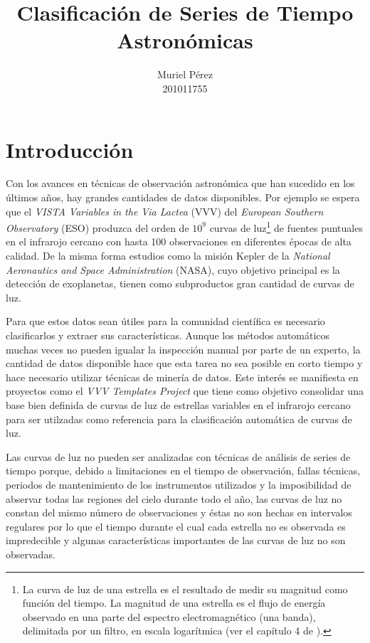 \documentclass[letterpaper,12pt]{book}
\title{Clasificación de Series de Tiempo Astronómicas}
\author{Muriel Pérez\\ 201011755}
\begin{document}
\maketitle
\tableofcontents 
\chapter{Introducción}

Con los avances en técnicas de observación astronómica que han sucedido en los últimos años, hay grandes cantidades de datos disponibles. Por ejemplo se espera que el \textit{VISTA Variables in the Via Lactea} (VVV) del \textit{European Southern Observatory} (ESO) produzca del orden de $10^{9}$ curvas de luz\footnote{\label{nota:curvasDeLuz} La curva de luz de una estrella es el resultado de medir su magnitud como función del tiempo. La magnitud de una estrella es el flujo de energía observado en una parte del espectro electromagnético (una banda), delimitada por un filtro, en escala logarítmica (ver el capítulo 4 de \cite{karttunen_fundamental_2007}).} de fuentes puntuales en el infrarojo cercano con hasta 100 observaciones en diferentes épocas de alta calidad. De la misma forma estudios como la misión Kepler de la \textit{National Aeronautics and Space Administration} (NASA), cuyo objetivo principal es la detección de exoplanetas,  tienen como subproductos gran cantidad de curvas  de luz. 

Para que estos datos sean útiles para la comunidad científica es necesario clasificarlos y extraer sus características. Aunque los métodos automáticos muchas veces no pueden igualar la inspección manual por parte de un experto, la cantidad de datos disponible hace que esta tarea no sea posible en corto tiempo y hace necesario utilizar técnicas de minería de datos. Este interés se manifiesta en proyectos como el \textit{VVV Templates Project} que tiene como objetivo consolidar una base bien definida de curvas de luz de estrellas variables en el infrarojo cercano para ser utilzadas como referencia para la clasificación automática de curvas de luz.

Las curvas de luz no pueden ser analizadas con técnicas de análisis de series de tiempo porque, debido a limitaciones en el tiempo de observación, fallas técnicas, periodos de mantenimiento de los instrumentos utilizados y la imposibilidad de abservar todas las regiones del cielo durante todo el año, las curvas de luz no constan del mismo número de observaciones y éstas no son hechas en intervalos regulares por lo que el tiempo durante el cual cada estrella no es observada es impredecible y algunas características importantes de las curvas de luz no son observadas. 
\end{document}
